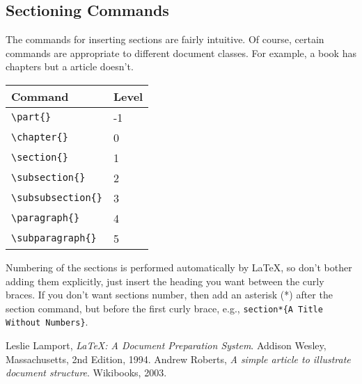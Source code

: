 \documentclass{article}  %
\begin{document}
\subsection{Sectioning Commands}
\label{sec:sectioning-commands}
  
The commands for inserting sections are fairly intuitive.  Of course, certain commands are
appropriate to different document classes. For example, a book has chapters but a article
doesn't.
  

\begin{center}
  \begin{tabular}{|l|l|}
    \hline 
    Command & Level \\ \hline
    \verb|\part{}| & -1 \\
    \verb|\chapter{}| & 0 \\
    \verb|\section{}| & 1 \\
    \verb|\subsection{}| & 2 \\
    \verb|\subsubsection{}| & 3 \\
    \verb|\paragraph{}| & 4 \\
    \verb|\subparagraph{}| & 5 \\
    \hline
  \end{tabular}
\end{center}

Numbering of the sections is performed automatically by \LaTeX{}, so don't bother adding
them explicitly, just insert the heading you want between the curly braces.  If you don't
want sections number, then add an asterisk (*) after the section command, but before the
first curly brace, e.g., \verb|section*{A Title| \verb|Without Numbers}|.

\begin{thebibliography}{99}
  Leslie Lamport,
  \emph{\LaTeX: A Document Preparation System}.
  Addison Wesley, Massachusetts,
  2nd Edition,
  1994.
    Andrew Roberts,
    \emph{A simple article to illustrate document structure}.
    Wikibooks,
    2003.
\end{thebibliography} %
\end{document}
